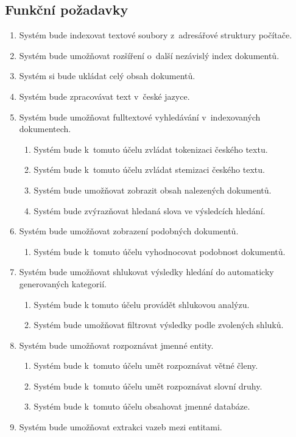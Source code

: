 \subsection{Funkční požadavky}
\label{req_0}
\begin{enumerate}
	\item \label{req_00} Systém bude indexovat textové soubory z~adresářové struktury počítače.
	\item \label{req_01} Systém bude umožňovat rozšíření o~další nezávislý index dokumentů.
	\item \label{req_02} Systém si bude ukládat celý obsah dokumentů.
	\item \label{req_03} Systém bude zpracovávat text v~české jazyce.
	\item \label{req_04} Systém bude umožňovat fulltextové vyhledávání v~indexovaných dokumentech.
	\begin{enumerate}
		\item \label{req_040} Systém bude k~tomuto účelu zvládat tokenizaci českého textu.
		\item \label{req_041} Systém bude k~tomuto účelu zvládat stemizaci českého textu.
		\item \label{req_042} Systém bude umožňovat zobrazit obsah nalezených dokumentů.
		\item \label{req_043} Systém bude zvýrazňovat hledaná slova ve výsledcích hledání.
	\end{enumerate}
	\item \label{req_05} Systém bude umožňovat zobrazení podobných dokumentů.
	\begin{enumerate}
		\item \label{req_050} Systém bude k~tomuto účelu vyhodnocovat podobnost dokumentů.
	\end{enumerate}
	\item \label{req_06} Systém bude umožňovat shlukovat výsledky hledání do automaticky generovaných kategorií.
	\begin{enumerate}
		\item \label{req_060} Systém bude k tomuto účelu provádět shlukovou analýzu.
		\item \label{req_061} Systém bude umožňovat filtrovat výsledky podle zvolených shluků.
	\end{enumerate}
	\item \label{req_07} Systém bude umožňovat rozpoznávat jmenné entity.
	\begin{enumerate}
		\item \label{req_070} Systém bude k~tomuto účelu umět rozpoznávat větné členy.
		\item \label{req_071} Systém bude k~tomuto účelu umět rozpoznávat slovní druhy.
		\item \label{req_072} Systém bude k~tomuto účelu obsahovat jmenné databáze.
	\end{enumerate}
	\item \label{req_08} Systém bude umožňovat extrakci vazeb mezi entitami.
\end{enumerate}

